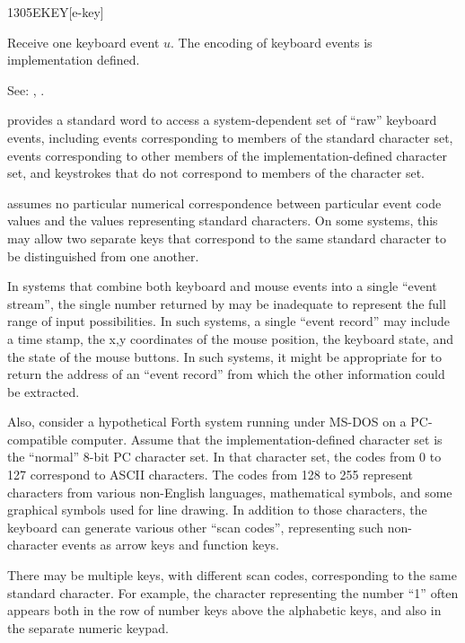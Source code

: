 \begin{newword}{1305}{EKEY}[e-key]

	Receive one keyboard event $u$. The encoding of keyboard events
	is implementation defined.

\item[See:]
	,
	.

	\begin{rationale} %
		 provides a standard word to access a system-dependent
		set of ``raw'' keyboard events, including events corresponding
		to members of the standard character set, events corresponding
		to other members of the implementation-defined character set,
		and keystrokes that do not correspond to members of the
		character set.

		 assumes no particular numerical correspondence
		between particular event code values and the values representing
		standard characters. On some systems, this may allow two
		separate keys that correspond to the same standard character
		to be distinguished from one another.

		In systems that combine both keyboard and mouse events into a
		single ``event stream'', the single number returned by
		 may be inadequate to represent the full range of
		input possibilities. In such systems, a single ``event record''
		may include a time stamp, the x,y coordinates of the mouse
		position, the keyboard state, and the state of the mouse
		buttons. In such systems, it might be appropriate for 
		to return the address of an ``event record'' from which the
		other information could be extracted.

		Also, consider a hypothetical Forth system running under
		MS-DOS on a PC-compatible computer. Assume that the
		implementation-defined character set is the ``normal'' 8-bit
		PC character set. In that character set, the codes from 0 to
		127 correspond to ASCII characters. The codes from 128 to 255
		represent characters from various non-English languages,
		mathematical symbols, and some graphical symbols used for line
		drawing. In addition to those characters, the keyboard can
		generate various other ``scan codes'', representing such
		non-character events as arrow keys and function keys.

		There may be multiple keys, with different scan codes,
		corresponding to the same standard character. For example,
		the character representing the number ``1'' often appears both
		in the row of number keys above the alphabetic keys, and also
		in the separate numeric keypad.


\end{rationale}
\end{newword}
